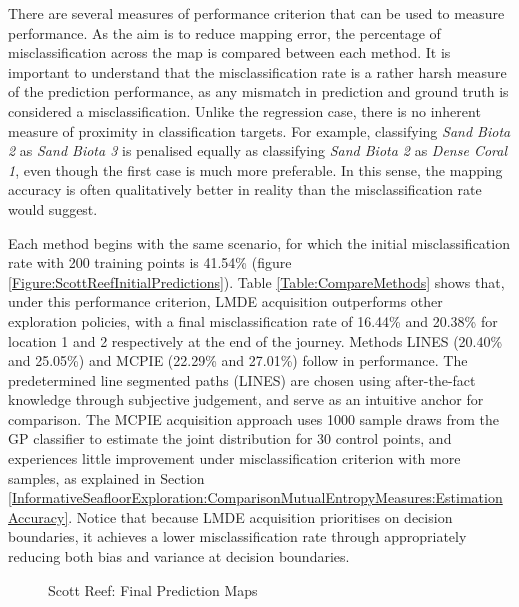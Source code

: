 			There are several measures of performance criterion that can be used to measure performance. As the aim is to reduce mapping error, the percentage of misclassification across the map is compared between each method. It is important to understand that the misclassification rate is a rather harsh measure of the prediction performance, as any mismatch in prediction and ground truth is considered a misclassification. Unlike the regression case, there is no inherent measure of proximity in classification targets. For example, classifying \textit{Sand Biota 2} as \textit{Sand Biota 3} is penalised equally as classifying \textit{Sand Biota 2} as \textit{Dense Coral 1}, even though the first case is much more preferable. In this sense, the mapping accuracy is often qualitatively better in reality than the misclassification rate would suggest.
			
			Each method begins with the same scenario, for which the initial misclassification rate with 200 training points is 41.54\% (figure \ref{Figure:ScottReefInitialPredictions}). Table \ref{Table:CompareMethods} shows that, under this performance criterion, LMDE acquisition outperforms other exploration policies, with a final misclassification rate of 16.44\% and 20.38\% for location 1 and 2 respectively at the end of the journey. Methods LINES (20.40\% and 25.05\%) and MCPIE (22.29\% and 27.01\%) follow in performance. The predetermined line segmented paths (LINES) are chosen using after-the-fact knowledge through subjective judgement, and serve as an intuitive anchor for comparison. The MCPIE acquisition approach uses 1000 sample draws from the GP classifier to estimate the joint distribution for 30 control points, and experiences little improvement under misclassification criterion with more samples, as explained in Section \ref{InformativeSeafloorExploration:ComparisonMutualEntropyMeasures:EstimationAccuracy}. Notice that because LMDE acquisition prioritises on decision boundaries, it achieves a lower misclassification rate through appropriately reducing both bias and variance at decision boundaries.
			
			\begin{figure}[!htbp]
			\centering
			\caption{Scott Reef: Final Prediction Maps}
			\label{Figure:FinalPredictionMap}
			\end{figure}
		
